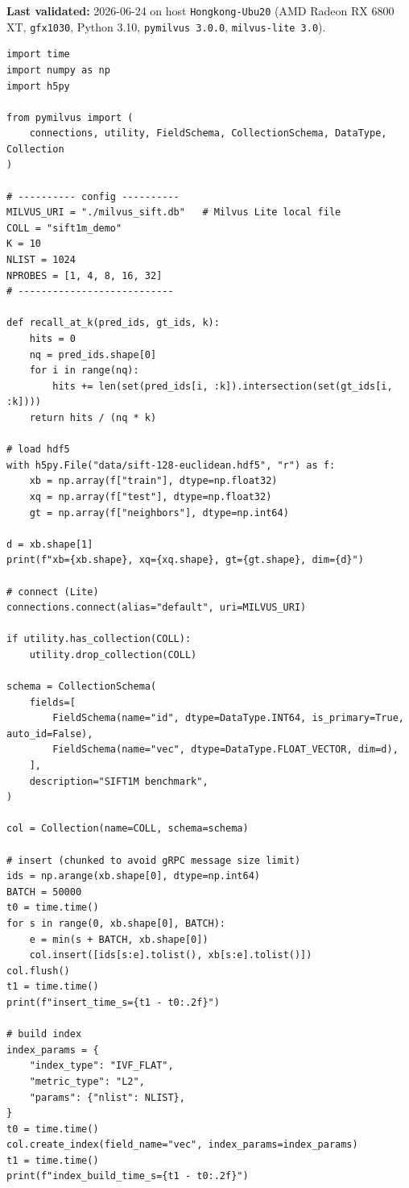 \documentclass[11pt,a4paper]{article}
\begin{document}
\noindent\textbf{Last validated:} 2026-06-24 on host \texttt{Hongkong-Ubu20}
(AMD Radeon RX 6800 XT, \texttt{gfx1030}, Python 3.10, \texttt{pymilvus 3.0.0},
\texttt{milvus-lite 3.0}).

\begin{verbatim}
import time
import numpy as np
import h5py

from pymilvus import (
    connections, utility, FieldSchema, CollectionSchema, DataType, Collection
)

# ---------- config ----------
MILVUS_URI = "./milvus_sift.db"   # Milvus Lite local file
COLL = "sift1m_demo"
K = 10
NLIST = 1024
NPROBES = [1, 4, 8, 16, 32]
# ---------------------------

def recall_at_k(pred_ids, gt_ids, k):
    hits = 0
    nq = pred_ids.shape[0]
    for i in range(nq):
        hits += len(set(pred_ids[i, :k]).intersection(set(gt_ids[i, :k])))
    return hits / (nq * k)

# load hdf5
with h5py.File("data/sift-128-euclidean.hdf5", "r") as f:
    xb = np.array(f["train"], dtype=np.float32)
    xq = np.array(f["test"], dtype=np.float32)
    gt = np.array(f["neighbors"], dtype=np.int64)

d = xb.shape[1]
print(f"xb={xb.shape}, xq={xq.shape}, gt={gt.shape}, dim={d}")

# connect (Lite)
connections.connect(alias="default", uri=MILVUS_URI)

if utility.has_collection(COLL):
    utility.drop_collection(COLL)

schema = CollectionSchema(
    fields=[
        FieldSchema(name="id", dtype=DataType.INT64, is_primary=True, auto_id=False),
        FieldSchema(name="vec", dtype=DataType.FLOAT_VECTOR, dim=d),
    ],
    description="SIFT1M benchmark",
)

col = Collection(name=COLL, schema=schema)

# insert (chunked to avoid gRPC message size limit)
ids = np.arange(xb.shape[0], dtype=np.int64)
BATCH = 50000
t0 = time.time()
for s in range(0, xb.shape[0], BATCH):
    e = min(s + BATCH, xb.shape[0])
    col.insert([ids[s:e].tolist(), xb[s:e].tolist()])
col.flush()
t1 = time.time()
print(f"insert_time_s={t1 - t0:.2f}")

# build index
index_params = {
    "index_type": "IVF_FLAT",
    "metric_type": "L2",
    "params": {"nlist": NLIST},
}
t0 = time.time()
col.create_index(field_name="vec", index_params=index_params)
t1 = time.time()
print(f"index_build_time_s={t1 - t0:.2f}")


\end{verbatim}
\end{document}
